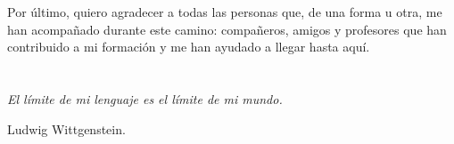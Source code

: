 Por último, quiero agradecer a todas las personas que, de una forma u otra, me han acompañado durante este camino: compañeros, amigos y profesores que han contribuido a mi formación y me han ayudado a llegar hasta aquí.



\cleardoublepage %
\chapter*{}
\setlength{\leftmargin}{0.5\textwidth}
\setlength{\parsep}{0cm}
\addtolength{\topsep}{0.5cm}
\begin{flushright}
\small\em{
El límite de mi lenguaje es el límite de mi mundo.
}
\end{flushright}
\begin{flushright}
\small{
Ludwig Wittgenstein.
}
\end{flushright}
\cleardoublepage %
